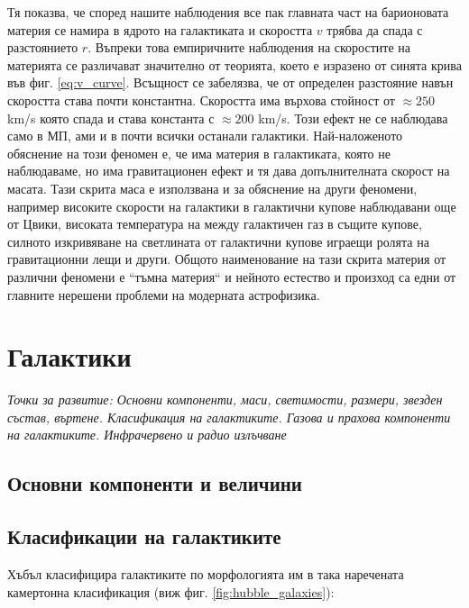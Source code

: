 \documentclass[a4paper,12pt]{article}
\begin{document}
Тя показва, че според нашите наблюдения все пак главната част на барионовата материя се намира в ядрото на галактиката и скоростта $v$ трябва да спада с разстоянието $r$. Въпреки това емпиричните наблюдения на скоростите на материята се различават значително от теорията, което е изразено от синята крива във фиг. \ref{eq:v_curve}. Всъщност се забелязва, че от определен разстояние навън скоростта става почти константна. Скоростта има върхова стойност от $\approx 250$ km/s която спада и става константа с $\approx 200$ km/s. Този ефект не се наблюдава само в МП, ами и в почти всички останали галактики. Най-наложеното обяснение на този феномен е, че има материя в галактиката, която не наблюдаваме, но има гравитационен ефект и тя дава допълнителната скорост на масата. Тази скрита маса е използвана и за обяснение на други феномени, например високите скорости на галактики в галактични купове наблюдавани още от Цвики, високата температура на между галактичен газ в същите купове, силното изкривяване на светлината от галактични купове играещи ролята на гравитационни лещи и други. Общото наименование на тази скрита материя от различни феномени е ``тъмна материя`` и нейното естество и произход са едни от главните нерешени проблеми на модерната астрофизика.


\section{Галактики}
\textit{Точки за развитие: Основни компоненти, маси, светимости, размери, звезден състав, въртене. Класификация на галактиките. Газова и прахова компоненти на галактиките. Инфрачервено и радио излъчване}

\subsection{Основни компоненти и величини}

\subsection{Класификации на галактиките}

Хъбъл класифицира галактиките по морфологията им в така наречената камертонна класификация (виж фиг. \ref{fig:hubble_galaxies}):
\end{document}

